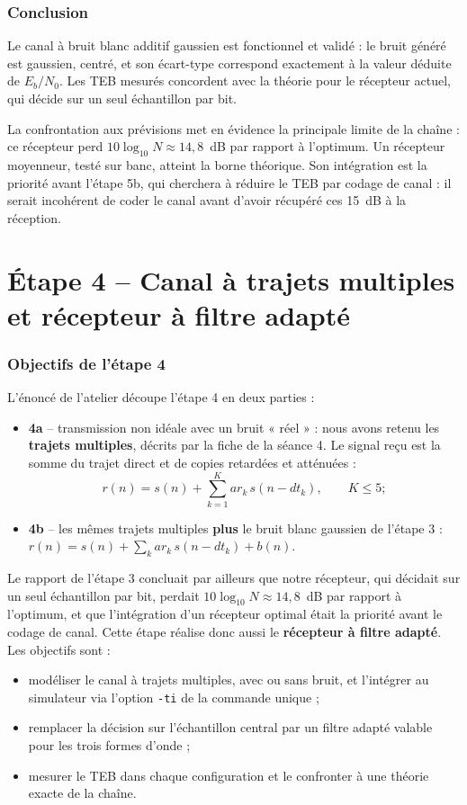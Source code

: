 \documentclass[11pt,a4paper]{article}
\newcommand{\EbNo}{E_b/N_0}
\begin{document}
\section{Conclusion}
Le canal à bruit blanc additif gaussien est fonctionnel et validé : le bruit généré est gaussien, centré, et son écart-type correspond exactement à la valeur déduite de $\EbNo$. Les TEB mesurés concordent avec la théorie pour le récepteur actuel, qui décide sur un seul échantillon par bit.

La confrontation aux prévisions met en évidence la principale limite de la chaîne : ce récepteur perd $10\log_{10}N\approx14{,}8$~dB par rapport à l'optimum. Un récepteur moyenneur, testé sur banc, atteint la borne théorique. Son intégration est la priorité avant l'étape 5b, qui cherchera à réduire le TEB par codage de canal : il serait incohérent de coder le canal avant d'avoir récupéré ces 15~dB à la réception.

\part{Étape 4 -- Canal à trajets multiples et récepteur à filtre adapté}
\section{Objectifs de l'étape 4}
L'énoncé de l'atelier découpe l'étape 4 en deux parties :
\begin{itemize}
  \item \textbf{4a} -- transmission non idéale avec un bruit « réel » : nous avons retenu les \textbf{trajets multiples}, décrits par la fiche de la séance 4. Le signal reçu est la somme du trajet direct et de copies retardées et atténuées :
  \[ r(n) = s(n) + \sum_{k=1}^{K} ar_k\, s(n - dt_k), \qquad K \le 5 ; \]
  \item \textbf{4b} -- les mêmes trajets multiples \textbf{plus} le bruit blanc gaussien de l'étape 3 : $r(n) = s(n) + \sum_k ar_k\,s(n-dt_k) + b(n)$.
\end{itemize}
Le rapport de l'étape 3 concluait par ailleurs que notre récepteur, qui décidait sur un seul échantillon par bit, perdait $10\log_{10}N \approx 14{,}8$~dB par rapport à l'optimum, et que l'intégration d'un récepteur optimal était la priorité avant le codage de canal. Cette étape réalise donc aussi le \textbf{récepteur à filtre adapté}. Les objectifs sont :
\begin{itemize}
  \item modéliser le canal à trajets multiples, avec ou sans bruit, et l'intégrer au simulateur via l'option \texttt{-ti} de la commande unique ;
  \item remplacer la décision sur l'échantillon central par un filtre adapté valable pour les trois formes d'onde ;
  \item mesurer le TEB dans chaque configuration et le confronter à une théorie exacte de la chaîne.
\end{itemize}
\end{document}
